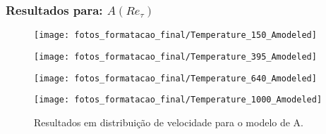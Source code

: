 \documentclass[xcolor=dvipsnames,10pt,aspectratio=169]{beamer}
\begin{document}
    \begin{frame}
		\frametitle{Resultados para: $A(Re_\tau)$}
\begin{figure}[!h]
	\centering
	\begin{minipage}[t]{0.5\textwidth}
		\centering
		\texttt{[image: fotos\_formatacao\_final/Temperature\_150\_Amodeled]}
		\caption{$Re_\tau = 150$, $L2_d = 0.28$}
	\end{minipage}
	\begin{minipage}[t]{0.45\textwidth}
		\centering
		\texttt{[image: fotos\_formatacao\_final/Temperature\_395\_Amodeled]}
		\caption{$Re_\tau = 395$, $L2_d = 0.16$}
	\end{minipage}
	\begin{minipage}[t]{0.5\textwidth}
		\centering
		\texttt{[image: fotos\_formatacao\_final/Temperature\_640\_Amodeled]}
		\caption{$Re_\tau = 640$, $L2_d = 0.14$}
	\end{minipage}
	\begin{minipage}[t]{0.45\textwidth}
		\centering
		\texttt{[image: fotos\_formatacao\_final/Temperature\_1000\_Amodeled]}
		\caption{$Re_\tau = 1020$, $L2_d = 0.13$}
	\end{minipage}	
	\caption{Resultados em distribuição de velocidade para o modelo de A.}
\end{figure}
		\end{frame}	

	
	
\end{document}
